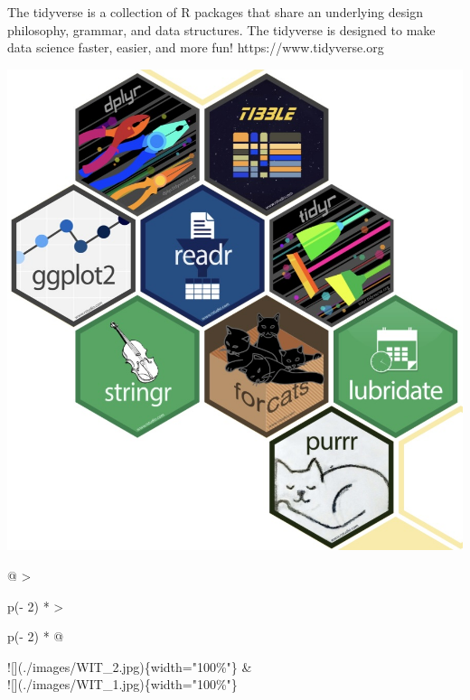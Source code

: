 \documentclass[
  letterpaper,
  DIV=11,
  numbers=noendperiod]{scrreprt}
\begin{document}
The tidyverse is a collection of R packages that share an underlying
design philosophy, grammar, and data structures. The tidyverse is
designed to make data science faster, easier, and more fun!
https://www.tidyverse.org

\includegraphics[width=1\textwidth,height=\textheight]{./images/WIT_1.jpg}

\begin{longtable}[]{@{}
  >{\raggedright\arraybackslash}p{(\columnwidth - 2\tabcolsep) * }
  >{\raggedright\arraybackslash}p{(\columnwidth - 2\tabcolsep) * }@{}}
\toprule\noalign{}
\endhead
\bottomrule\noalign{}
\endlastfoot
!{[}{]}(./images/WIT\_2.jpg)\{width="100\%"\} &
 \\
!{[}{]}(./images/WIT\_1.jpg)\{width="100\%"\} \\
\end{longtable}
\end{document}
